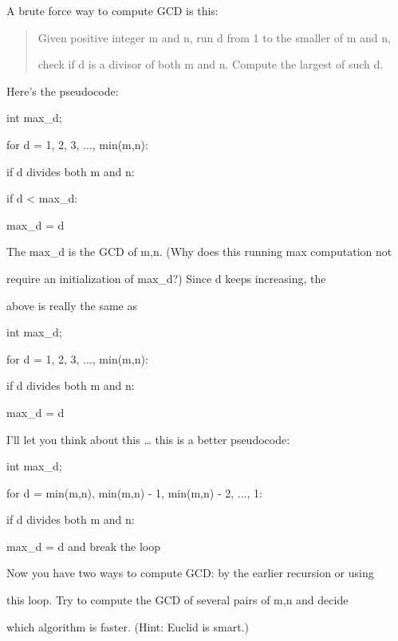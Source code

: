 A brute force way to compute GCD is this:



\begin{quote}

Given positive integer m and n, run d from 1 to the smaller of m and n,

check if d is a divisor of both m and n. Compute the largest of such d.

\end{quote}



Here's the pseudocode:



\begin{consolethree}

int max_d;

for d = 1, 2, 3, ..., min(m,n):

    if d divides both m and n:

        if d < max_d:

            max_d = d

\end{consolethree}



The max\_d is the GCD of m,n. (Why does this running max computation not

require an initialization of max\_d?) Since d keeps increasing, the

above is really the same as



\begin{consolethree}

int max_d;

for d = 1, 2, 3, ..., min(m,n):

    if d divides both m and n:

        max_d = d

\end{consolethree}



I'll let you think about this \ldots{} this is a better pseudocode:



\begin{consolethree}

int max_d;

for d = min(m,n), min(m,n) - 1, min(m,n) - 2, ..., 1:

    if d divides both m and n:

        max_d = d and break the loop

\end{consolethree}



Now you have two ways to compute GCD: by the earlier recursion or using

this loop. Try to compute the GCD of several pairs of m,n and decide

which algorithm is faster. (Hint: Euclid is smart.)

